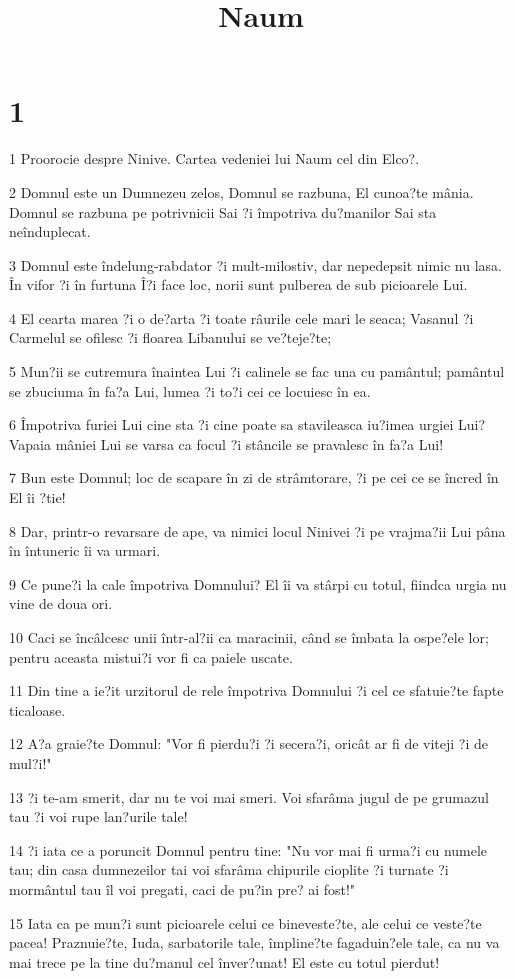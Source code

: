 

\title{Naum}


\chapter{1}

\par 1 Proorocie despre Ninive. Cartea vedeniei lui Naum cel din Elco?.
\par 2 Domnul este un Dumnezeu zelos, Domnul se razbuna, El cunoa?te mânia. Domnul se razbuna pe potrivnicii Sai ?i împotriva du?manilor Sai sta neînduplecat.
\par 3 Domnul este îndelung-rabdator ?i mult-milostiv, dar nepedepsit nimic nu lasa. În vifor ?i în furtuna Î?i face loc, norii sunt pulberea de sub picioarele Lui.
\par 4 El cearta marea ?i o de?arta ?i toate râurile cele mari le seaca; Vasanul ?i Carmelul se ofilesc ?i floarea Libanului se ve?teje?te;
\par 5 Mun?ii se cutremura înaintea Lui ?i calinele se fac una cu pamântul; pamântul se zbuciuma în fa?a Lui, lumea ?i to?i cei ce locuiesc în ea.
\par 6 Împotriva furiei Lui cine sta ?i cine poate sa stavileasca iu?imea urgiei Lui? Vapaia mâniei Lui se varsa ca focul ?i stâncile se pravalesc în fa?a Lui!
\par 7 Bun este Domnul; loc de scapare în zi de strâmtorare, ?i pe cei ce se încred în El îi ?tie!
\par 8 Dar, printr-o revarsare de ape, va nimici locul Ninivei ?i pe vrajma?ii Lui pâna în întuneric îi va urmari.
\par 9 Ce pune?i la cale împotriva Domnului? El îi va stârpi cu totul, fiindca urgia nu vine de doua ori.
\par 10 Caci se încâlcesc unii într-al?ii ca maracinii, când se îmbata la ospe?ele lor; pentru aceasta mistui?i vor fi ca paiele uscate.
\par 11 Din tine a ie?it urzitorul de rele împotriva Domnului ?i cel ce sfatuie?te fapte ticaloase.
\par 12 A?a graie?te Domnul: "Vor fi pierdu?i ?i secera?i, oricât ar fi de viteji ?i de mul?i!"
\par 13 ?i te-am smerit, dar nu te voi mai smeri. Voi sfarâma jugul de pe grumazul tau ?i voi rupe lan?urile tale!
\par 14 ?i iata ce a poruncit Domnul pentru tine: "Nu vor mai fi urma?i cu numele tau; din casa dumnezeilor tai voi sfarâma chipurile cioplite ?i turnate ?i mormântul tau îl voi pregati, caci de pu?in pre? ai fost!"
\par 15 Iata ca pe mun?i sunt picioarele celui ce bineveste?te, ale celui ce veste?te pacea! Praznuie?te, Iuda, sarbatorile tale, împline?te fagaduin?ele tale, ca nu va mai trece pe la tine du?manul cel înver?unat! El este cu totul pierdut!

